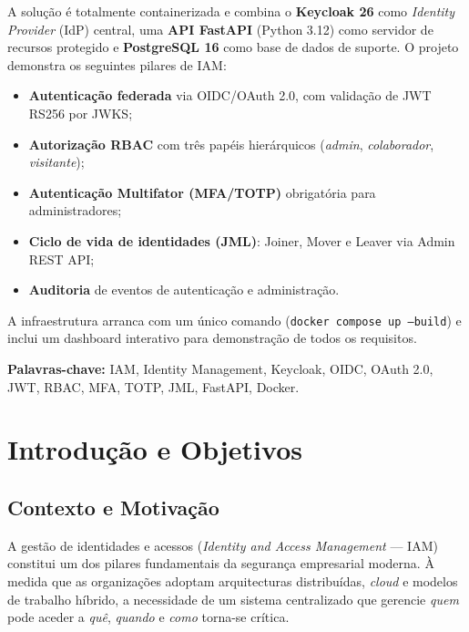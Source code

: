 \documentclass[12pt,a4paper]{article}
\begin{document}
A solução é totalmente containerizada e combina o \textbf{Keycloak 26} como \textit{Identity Provider} (IdP) central, uma \textbf{API FastAPI} (Python 3.12) como servidor de recursos protegido e \textbf{PostgreSQL 16} como base de dados de suporte. O projeto demonstra os seguintes pilares de IAM:

\begin{itemize}[leftmargin=1.5cm]
  \item \textbf{Autenticação federada} via OIDC/OAuth 2.0, com validação de JWT RS256 por JWKS;
  \item \textbf{Autorização RBAC} com três papéis hierárquicos (\textit{admin}, \textit{colaborador}, \textit{visitante});
  \item \textbf{Autenticação Multifator (MFA/TOTP)} obrigatória para administradores;
  \item \textbf{Ciclo de vida de identidades (JML)}: Joiner, Mover e Leaver via Admin REST API;
  \item \textbf{Auditoria} de eventos de autenticação e administração.
\end{itemize}

A infraestrutura arranca com um único comando (\texttt{docker compose up --build}) e inclui um dashboard interativo para demonstração de todos os requisitos.

\vspace{0.5cm}
\noindent\textbf{Palavras-chave:} IAM, Identity Management, Keycloak, OIDC, OAuth 2.0, JWT, RBAC, MFA, TOTP, JML, FastAPI, Docker.

\newpage
\tableofcontents

\newpage
\section{Introdução e Objetivos}

\subsection{Contexto e Motivação}

A gestão de identidades e acessos (\textit{Identity and Access Management} — IAM) constitui um dos pilares fundamentais da segurança empresarial moderna. À medida que as organizações adoptam arquitecturas distribuídas, \textit{cloud} e modelos de trabalho híbrido, a necessidade de um sistema centralizado que gerencie \textit{quem} pode aceder a \textit{quê}, \textit{quando} e \textit{como} torna-se crítica.
\end{document}
